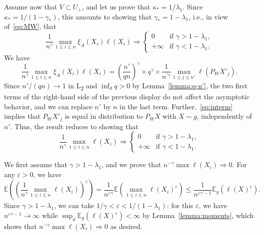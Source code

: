 \documentclass[]{article}
\newcommand{\E}{\mathbb{E}}
\theoremstyle{plain}
\theoremstyle{definition}
\begin{document}
Assume now that $V \subset U_\perp$, and let us prove that $\kappa_* = 1/\lambda_1$. Since $\kappa_* = 1/(1-\gamma_*)$, this amounts to showing that $\gamma_* = 1-\lambda_1$, i.e., in view of~\eqref{eq:MW}, that
\[ \frac{1}{n^\gamma} \max_{1 \leq i \leq n} \xi_A(X_i) \ell(X_i) \Rightarrow \left\{ \begin{array}{ll} 0 & \text{if } \gamma > 1-\lambda_1,\\
	+\infty & \text{if } \gamma < 1-\lambda_1. \end{array} \right. \]
We have
\[ \frac{1}{n^\gamma} \max_{1 \leq i \leq n} \xi_A(X_i) \ell(X_i) = \left( \frac{n'}{qn} \right)^\gamma \times q^\gamma \times \frac{1}{n^{\prime \gamma}} \max_{1 \leq j \leq n'} \ell(P_W X'_j). \]
Since $n'/(qn) \to 1$ in L\textsubscript2 and $\inf_d q > 0$ by Lemma~\ref{lemma:q-n'}, the two first terms of the right-hand side of the previous display do not affect the asymptotic behavior, and we can replace $n'$ by $n$ in the last term. Further,~\eqref{eq:interm} implies that $P_W X'_j$ is equal in distribution to $P_W X$ with $X \sim g$, independently of $n'$. Thus, the result reduces to showing that
\[ \frac{1}{n^\gamma} \max_{1 \leq i \leq n} \ell(X_i) \Rightarrow \left\{ \begin{array}{ll} 0 & \text{if } \gamma > 1-\lambda_1,\\
	+\infty & \text{if } \gamma < 1-\lambda_1. \end{array} \right. \]

We first assume that $\gamma > 1-\lambda_1$, and we prove that $n^{-\gamma} \max \ell(X_i) \Rightarrow 0$. For any $\varepsilon > 0$, we have
\[ \E \left( \left( \frac{1}{n^\gamma} \max_{1 \leq i \leq n} \ell(X_i) \right)^\varepsilon \right) = \frac{1}{n^{\varepsilon \gamma}} \E \left( \max_{1 \leq i \leq n} \ell(X_i)^\varepsilon \right) \leq \frac{1}{n^{\varepsilon \gamma-1}} \E_g \left( \ell(X)^\varepsilon \right). \]
Since $\gamma > 1-\lambda_1$, we can take $1/\gamma < \varepsilon < 1/(1-\lambda_1)$: for this $\varepsilon$, we have $n^{\varepsilon \gamma - 1} \to \infty$ while $\sup_d \E_g(\ell(X)^\varepsilon) < \infty$ by Lemma~\ref{lemma:moments}, which shows that $n^{-\gamma} \max \ell(X_i) \Rightarrow 0$ as desired.
\end{document}
